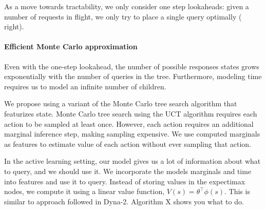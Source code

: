 %
As a move towards tractability, we only consider one step lookaheads: given a number of requests in flight, we only try to place a single query optimally ( right). 

\paragraph{Efficient Monte Carlo approximation}

Even with the one-step lookahead, the number of possible responses states grows exponentially with the number of queries in the tree.
Furthermore, modeling time requires us to model an infinite number of children.

We propose using a variant of the Monte Carlo tree search algorithm\needcite{}  that featurizes state.
Monte Carlo tree search using the UCT algorithm requires each action to be sampled at least once.
However, each action requires an additional marginal inference step, making sampling expensive.
We use computed marginals as features to estimate value of each action without ever sampling that action.

In the active learning setting, our model gives us a lot of information about what to query, and we should use it.
We incorporate the models marginals and time into features and use it to query.
Instead of storing values in the expectimax nodes, we compute it using a linear value function, $V(s) = \theta^\top \phi(s)$.
This is similar to approach followed in Dyna-2.
Algorithm X shows you what to do.

